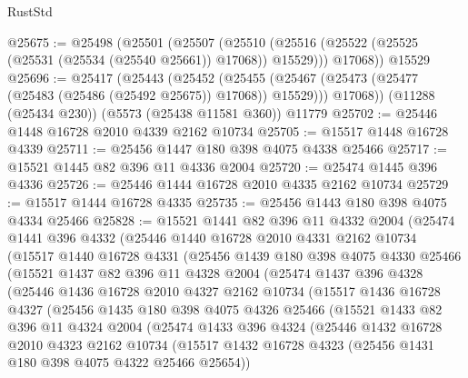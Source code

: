 \begin{lexlean}{RustStd}
\begin{coremodule}
@25675 := @25498
    (@25501
      (@25507
        (@25510 (@25516 (@25522 (@25525 (@25531 (@25534 (@25540 @25661)) @17068)) @15529)))
        @17068))
    @15529
@25696 := @25417
    (@25443
      (@25452
        (@25455 (@25467 (@25473 (@25477 (@25483 (@25486 (@25492 @25675)) @17068)) @15529)))
        @17068))
    (@11288 (@25434 @230))
    (@5573 (@25438 @11581 @360))
    @11779
@25702 := @25446 @1448 @16728 @2010 @4339 @2162 @10734
@25705 := @15517 @1448 @16728 @4339
@25711 := @25456 @1447 @180 @398 @4075 @4338 @25466
@25717 := @15521 @1445 @82 @396 @11 @4336 @2004
@25720 := @25474 @1445 @396 @4336
@25726 := @25446 @1444 @16728 @2010 @4335 @2162 @10734
@25729 := @15517 @1444 @16728 @4335
@25735 := @25456 @1443 @180 @398 @4075 @4334 @25466
@25828 := @15521
    @1441
    @82
    @396
    @11
    @4332
    @2004
    (@25474
      @1441
      @396
      @4332
      (@25446
        @1440
        @16728
        @2010
        @4331
        @2162
        @10734
        (@15517
          @1440
          @16728
          @4331
          (@25456
            @1439
            @180
            @398
            @4075
            @4330
            @25466
            (@15521
              @1437
              @82
              @396
              @11
              @4328
              @2004
              (@25474
                @1437
                @396
                @4328
                (@25446
                  @1436
                  @16728
                  @2010
                  @4327
                  @2162
                  @10734
                  (@15517
                    @1436
                    @16728
                    @4327
                    (@25456
                      @1435
                      @180
                      @398
                      @4075
                      @4326
                      @25466
                      (@15521
                        @1433
                        @82
                        @396
                        @11
                        @4324
                        @2004
                        (@25474
                          @1433
                          @396
                          @4324
                          (@25446
                            @1432
                            @16728
                            @2010
                            @4323
                            @2162
                            @10734
                            (@15517
                              @1432
                              @16728
                              @4323
                              (@25456 @1431 @180 @398 @4075 @4322 @25466 @25654))

\end{coremodule}
\end{lexlean}
